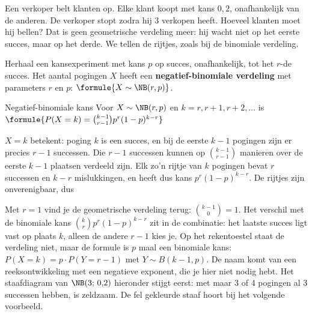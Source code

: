 Een verkoper belt klanten op. Elke klant koopt met kans $0{,}2$, onafhankelijk van de anderen. De verkoper stopt zodra hij 3 verkopen heeft. Hoeveel klanten moet hij bellen? Dat is geen geometrische verdeling meer: hij wacht niet op het eerste succes, maar op het derde. We tellen de rijtjes, zoals bij de binomiale verdeling.

\begin{theorie}
Herhaal een kansexperiment met kans $p$ op succes, onafhankelijk, tot het $r$-de succes. Het aantal pogingen $X$ heeft een \textbf{\textcolor{accent}{negatief-binomiale verdeling}} met parameters $r$ en $p$: $\formule{X \sim \NB(r, p)}$.

\begin{stelling}{Negatief-binomiale kans}
Voor $X \sim \NB(r, p)$ en $k = r, r + 1, r + 2, \ldots$ is \quad $\formule{P(X = k) = \binom{k - 1}{r - 1} p^r (1 - p)^{k - r}}$
\end{stelling}

\begin{bewijs}
$X = k$ betekent: poging $k$ is een succes, en bij de eerste $k - 1$ pogingen zijn er precies $r - 1$ successen. Die $r - 1$ successen kunnen op $\binom{k-1}{r-1}$ manieren over de eerste $k - 1$ plaatsen verdeeld zijn. Elk zo'n rijtje van $k$ pogingen bevat $r$ successen en $k - r$ mislukkingen, en heeft dus kans $p^r(1 - p)^{k-r}$. De rijtjes zijn onverenigbaar, dus
\end{bewijs}
\end{theorie}

Met $r = 1$ vind je de geometrische verdeling terug: $\binom{k-1}{0} = 1$. Het verschil met de binomiale kans $\binom{k}{r}p^r(1 - p)^{k-r}$ zit in de combinatie: het laatste succes ligt vast op plaats $k$, alleen de andere $r - 1$ kies je. Op het rekentoestel staat de verdeling niet, maar de formule is $p$ maal een binomiale kans: $P(X = k) = p \cdot P(Y = r - 1)$ met $Y \sim B(k - 1, p)$. De naam komt van een reeksontwikkeling met een negatieve exponent, die je hier niet nodig hebt. Het staafdiagram van $\NB(3;\, 0{,}2)$ hieronder stijgt eerst: met maar 3 of 4 pogingen al 3 successen hebben, is zeldzaam. De fel gekleurde staaf hoort bij het volgende voorbeeld.


